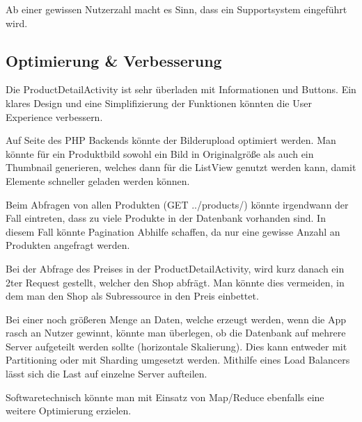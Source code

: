 \documentclass{scrartcl}
\begin{document}
\noindent Ab einer gewissen Nutzerzahl macht es Sinn, dass ein Supportsystem eingeführt wird. \newline 

\subsection{Optimierung \& Verbesserung}

\noindent Die ProductDetailActivity ist sehr überladen mit Informationen und Buttons. Ein klares Design und eine Simplifizierung der Funktionen könnten die User Experience verbessern. \newline

\noindent Auf Seite des PHP Backends könnte der Bilderupload optimiert werden. Man könnte für ein Produktbild sowohl ein Bild in Originalgröße als auch ein Thumbnail generieren, welches dann für die ListView genutzt werden kann, damit Elemente schneller geladen werden können. \newline 

\noindent Beim Abfragen von allen Produkten (GET ../products/) könnte irgendwann der Fall eintreten, dass zu viele Produkte in der Datenbank vorhanden sind. In diesem Fall könnte Pagination Abhilfe schaffen, da nur eine gewisse Anzahl an Produkten angefragt werden. \newline  

\noindent Bei der Abfrage des Preises in der ProductDetailActivity, wird kurz danach ein 2ter Request gestellt, welcher den Shop abfrägt. Man könnte dies vermeiden, in dem man den Shop als Subressource in den Preis einbettet. \newline 

\noindent Bei einer noch größeren Menge an Daten, welche erzeugt werden, wenn die App rasch an Nutzer gewinnt, könnte man überlegen, ob die Datenbank auf mehrere Server aufgeteilt werden sollte (horizontale Skalierung). Dies kann entweder mit Partitioning oder mit Sharding umgesetzt werden. Mithilfe eines Load Balancers lässt sich die Last auf einzelne Server aufteilen. \newline 

\noindent Softwaretechnisch könnte man mit Einsatz von Map/Reduce ebenfalls eine weitere Optimierung erzielen.

\newpage


\end{document}
